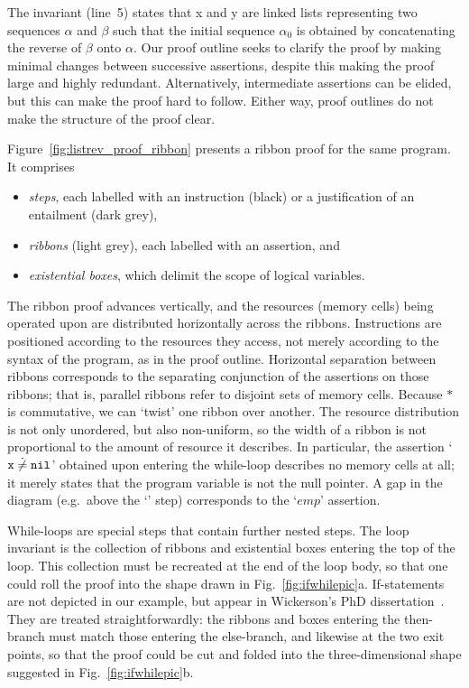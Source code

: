 \documentclass[runningheads,a4paper]{llncs}
\renewcommand{\emp}{\ensuremath{\mathit{emp}}}
\begin{document}
The invariant (line~5) states that {\code x} and {\code y} are linked lists representing two sequences $α$ and $β$ such that the initial sequence $α_0$ is obtained by concatenating the reverse of $β$ onto $α$. Our proof outline seeks to clarify the proof by making minimal changes between successive assertions, despite this making the proof large and highly redundant. Alternatively, intermediate assertions can be elided, but this can make the proof hard to follow. Either way, proof outlines do not make the structure of the proof clear.

Figure~\ref{fig:listrev_proof_ribbon} presents a ribbon proof for the same program. It comprises
\begin{itemize}
\item \emph{steps}, each labelled with an instruction (black) or a justification of an entailment (dark grey),
\item \emph{ribbons} (light grey), each labelled with an assertion, and 
\item \emph{existential boxes}, which delimit the scope of logical variables.
\end{itemize}
\noindent The ribbon proof advances vertically, and the resources (memory cells) being operated upon are distributed horizontally across the ribbons. Instructions are positioned according to the resources they access, not merely according to the syntax of the program, as in the proof outline. Horizontal separation between ribbons corresponds to the separating conjunction of the assertions on those ribbons; that is, parallel ribbons refer to disjoint sets of memory cells. Because $*$ is commutative, we can `twist' one ribbon over another. The resource distribution is not only unordered, but also non-uniform, so the width of a ribbon is not proportional to the amount of resource it describes. In particular, the assertion `$\texttt{x}\mathrel{\dot\neq} \texttt{nil}$' obtained upon entering the while-loop describes no memory cells at all; it merely states that the program variable  is not the null pointer. A gap in the diagram (e.g.\ above the `' step) corresponds to the `$\emp$' assertion.

While-loops are special steps that contain further nested steps. The loop invariant is the collection of ribbons and existential boxes entering the top of the loop. This collection must be recreated at the end of the loop body, so that one could roll the proof into the shape drawn in Fig.~\ref{fig:ifwhilepic}a. If-statements are not depicted in our example, but appear in Wickerson's PhD dissertation~\cite{wickerson13}. They are treated straightforwardly: the ribbons and boxes entering the then-branch must match those entering the else-branch, and likewise at the two exit points, so that the proof could be cut and folded into the three-dimensional shape suggested in Fig.~\ref{fig:ifwhilepic}b.
\end{document}
